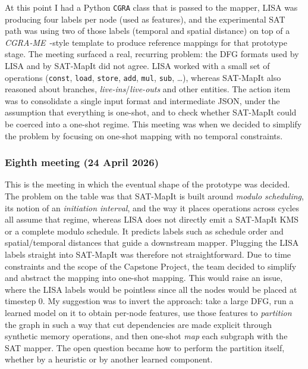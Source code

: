 \documentclass[10pt]{article}
\begin{document}
At this point I had a Python \texttt{CGRA} class that is passed to the
mapper, LISA was producing four labels per node (used as features), and
the experimental SAT path was using two of those labels (temporal and
spatial distance) on top of a \textit{CGRA-ME}~\cite{10596517}-style template to produce
reference mappings for that prototype stage. The meeting surfaced a real, recurring problem: the DFG
formats used by LISA and by SAT-MapIt did not agree. LISA worked with a
small set of operations (\texttt{const}, \texttt{load}, \texttt{store},
\texttt{add}, \texttt{mul}, \texttt{sub}, \ldots), whereas SAT-MapIt
also reasoned about branches, \textit{live-ins}/\textit{live-outs} and other entities.
The action item was to consolidate a single input format and intermediate
JSON, under the assumption that everything is one-shot, and to check
whether SAT-MapIt could be coerced into a one-shot regime. This meeting was
when we decided to simplify the problem by focusing on one-shot mapping with no temporal constraints.

\subsubsection{Eighth meeting (24 April 2026)}

This is the meeting in which the eventual shape of the prototype was
decided. The problem on the table was that SAT-MapIt is built around
\textit{modulo scheduling}, its notion of an \textit{initiation
	interval}, and the way it places operations across cycles all assume
that regime, whereas LISA does not directly emit a SAT-MapIt KMS or a
complete modulo schedule. It predicts labels such as schedule order and
spatial/temporal distances that guide a downstream mapper. Plugging the LISA
labels straight into SAT-MapIt was therefore not straightforward. Due to time constraints and the scope of the Capstone Project,
the team decided to simplify and abstract the mapping into one-shot mapping. This would raise
an issue, where the LISA labels would be pointless since all the nodes would be placed at timestep
0. My suggestion was to invert the approach: take a large DFG, run a learned model on it to obtain
per-node features, use those features to \emph{partition} the graph in such
a way that cut dependencies are made explicit through synthetic memory
operations, and then one-shot
\textit{map} each subgraph with the SAT mapper. The open question
became how to perform the partition itself, whether by a heuristic or by
another learned component.
\end{document}
